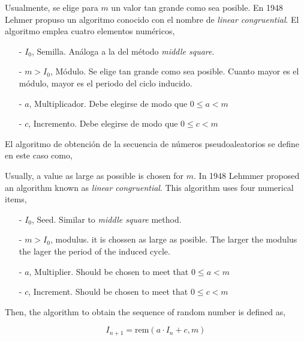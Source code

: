 \begin{paracol}{2}
Usualmente, se elige para $m$ un valor tan grande como sea posible. 
En 1948 Lehmer propuso un algoritmo conocido con el nombre de \emph{linear congruential}. El algoritmo emplea cuatro elementos numéricos,

\begin{itemize}
\item[-] $I_0$, Semilla. Análoga a la del método \emph{middle square}.
\item[-] $m > I_0$, Módulo.  Se elige tan grande como sea posible. Cuanto mayor es el módulo, mayor es el periodo del ciclo inducido.
\item[-] $a$, Multiplicador. Debe elegirse de modo que $0\le a < m$
\item[-] $c$, Incremento. Debe elegirse de modo que $0\le c < m$
\end{itemize}
 
El algoritmo de obtención de la secuencia de números pseudoaleatorios se define en este caso como,

\switchcolumn
Usually, a value as large as possible is chosen for $m$. In 1948 Lehmmer proposed an algorithm known as \emph{linear congruential}. This algorithm uses four numerical items,

\begin{itemize}
	\item[-] $I_0$, Seed. Similar to \emph{middle square} method.
	\item[-] $m > I_0$, modulus.  it is chossen as large as posible. The larger the modulus the lager the period of the induced cycle.
	\item[-] $a$, Multiplier. Should be chosen to meet that $0\le a < m$
	\item[-] $c$, Increment. Should be chosen to meet that $0\le c < m$
\end{itemize}
 
 Then, the algorithm to obtain the sequence of random number is defined as,
\end{paracol}

\begin{equation*}
I_{n+1}=\text{rem}(a\cdot I_n+c, m)
\end{equation*}

